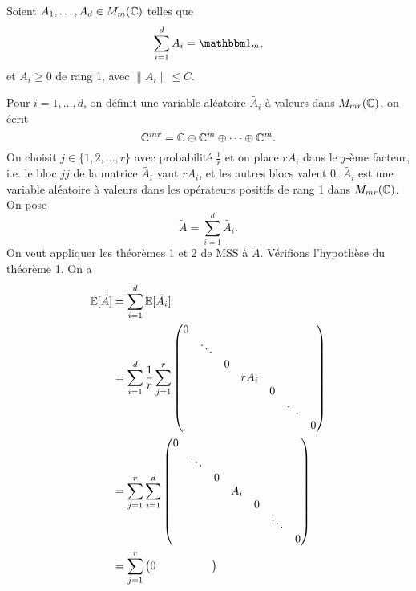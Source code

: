 \begin{preuve}
  Soient $A_1, \ldots, A_d \in M_m(\mathbb{C})$ telles que 
  \[ \sum_{i = 1}^{d}A_i = \un_m, \]
  et $A_i \geq 0$ de rang 1, avec $\|A_i\| \leq C$.

  Pour $i  =1, \ldots, d$, on définit une variable aléatoire $\tilde{A_i}$ à valeurs dans $M_{mr}(\mathbb{C})$, on
  écrit 
  \[ \mathbb{C}^{mr} = \mathbb{C} \oplus \mathbb{C}^m \oplus \cdots \oplus \mathbb{C}^m. \]
  On choisit $j \in \{1, 2, \ldots, r\}$ avec probabilité $\frac{1}{r}$ et on place $r A_i$ dans le $j$-ème
  facteur, i.e. le bloc $jj$ de la matrice $\tilde{A_i}$ vaut $rA_i$, et les autres blocs valent
  0. $\tilde{A_i}$ est une variable aléatoire à valeurs dans les opérateurs positifs de rang 1 dans
  $M_{mr}(\mathbb{C})$. On pose 
  \[ \tilde{A} = \sum_{i = 1}^{d} \tilde{A_i}. \]
  On veut appliquer les théorèmes 1 et 2 de MSS à $\tilde{A}$. Vérifions l'hypothèse du théorème 1. On a 
  \begin{align*}
    \mathbb{E}[\tilde{A}]
    &= \sum_{i = 1}^{d} \mathbb{E}[\tilde{A_i}] \\
    &= \sum_{i = 1}^{d} \frac{1}{r} \sum_{j = 1}^{r}
    \begin{pmatrix}
      0 &        &    & && \\
        & \ddots & & && \\
        &        & 0 &      & && \\
        &        &   & rA_i & & &\\
        &        &   &      & 0 & & \\
        &        &   &      &   & \ddots & \\
        &        &   &      &   &        & 0     
      \end{pmatrix}\\
    &= \sum_{j = 1}^{r} \sum_{i = 1}^{d}
      \begin{pmatrix}
      0 &        &    & && \\
        & \ddots & & && \\
        &        & 0 &      & && \\
        &        &   & A_i & & &\\
        &        &   &      & 0 & & \\
        &        &   &      &   & \ddots & \\
        &        &   &      &   &        & 0  
      \end{pmatrix}\\
    &= \sum_{j = 1}^{r}
      \begin{pmatrix}
      0 &        &    & && \\

\end{pmatrix}
\end{align*}
\end{preuve}
